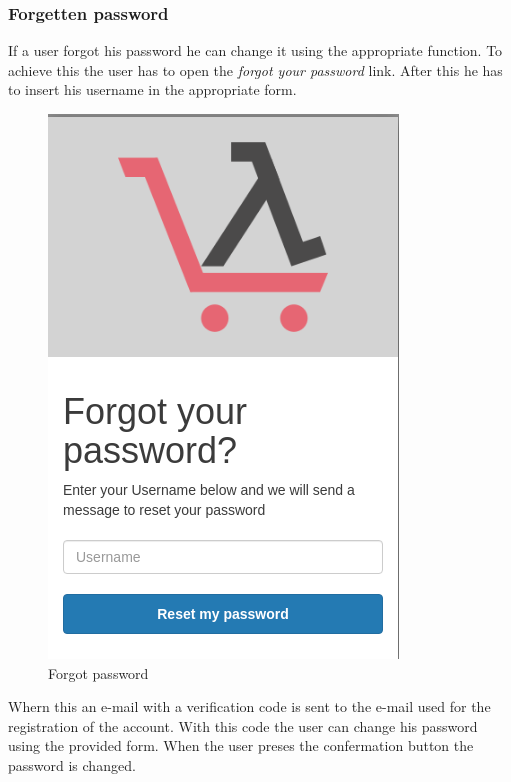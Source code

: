 \subsubsection{Forgetten password}
If a user forgot his password he can change it using the appropriate function. To achieve this the user has to open the \textit{forgot your password} link. After this he has to insert his username in the appropriate form.
\begin{figure}[!ht]
    \caption{Forgot password}
    \vspace{10px}
    \includegraphics[scale=0.3]{../../../../Images/userManual/forgotPWD.png}
    \centering
\end{figure}
Whern this an e-mail with a verification code is sent to the e-mail used for the registration of the account. With this code the user can change his password using the provided form. When the user preses the confermation button the password is changed.
